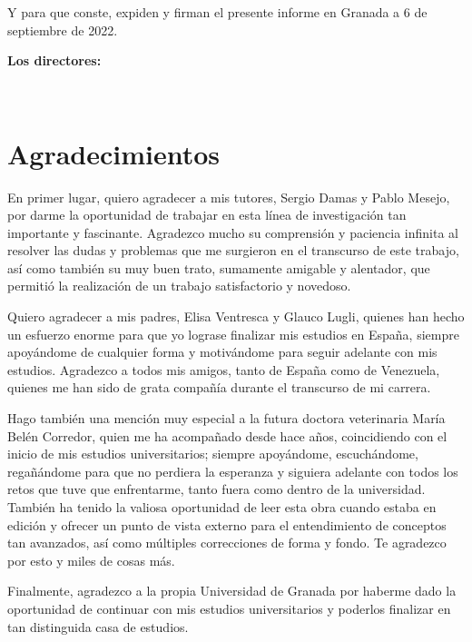 Y para que conste, expiden y firman el presente informe en Granada a 6 de septiembre de 2022.

\vspace{0.5cm}

\textbf{Los directores:}

\vspace{5cm}

\noindent \textbf{\myProf \ \ \ \ \ \ \ \ \ \ \ \ \ \myOtherProf}

\chapter*{Agradecimientos}
\thispagestyle{empty}

       \vspace{1cm}


En primer lugar, quiero agradecer a mis tutores, Sergio Damas y Pablo Mesejo, por darme la oportunidad de trabajar en esta línea de investigación tan importante y fascinante. Agradezco mucho su comprensión y paciencia infinita al resolver las dudas y problemas que me surgieron en el transcurso de este trabajo, así como también su muy buen trato, sumamente amigable y alentador, que permitió la realización de un trabajo satisfactorio y novedoso. 

Quiero agradecer a mis padres, Elisa Ventresca y Glauco Lugli, quienes han hecho un esfuerzo enorme para que yo lograse finalizar mis estudios en España, siempre apoyándome de cualquier forma y motivándome para seguir adelante con mis estudios. Agradezco a todos mis amigos, tanto de España como de Venezuela, quienes me han sido de grata compañía durante el transcurso de mi carrera.

Hago también una mención muy especial a la futura doctora veterinaria María Belén Corredor, quien me ha acompañado desde hace años, coincidiendo con el inicio de mis estudios universitarios; siempre apoyándome, escuchándome, regañándome para que no perdiera la esperanza y siguiera adelante con todos los retos que tuve que enfrentarme, tanto fuera como dentro de la universidad. También ha tenido la valiosa oportunidad de leer esta obra cuando estaba en edición y ofrecer un punto de vista externo para el entendimiento de conceptos tan avanzados, así como múltiples correcciones de forma y fondo. Te agradezco por esto y miles de cosas más.

Finalmente, agradezco a la propia Universidad de Granada por haberme dado la oportunidad de continuar con mis estudios universitarios y poderlos finalizar en tan distinguida casa de estudios.